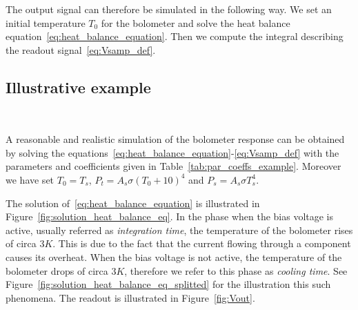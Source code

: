 The output signal can therefore be simulated in the following way. We
set an initial temperature $T_0$ for the bolometer and solve the heat
balance equation~\eqref{eq:heat_balance_equation}. Then we compute the
integral describing the readout signal~\eqref{eq:Vsamp_def}.


\subsection{Illustrative example}~\label{sec:example}

A reasonable and realistic simulation of the bolometer response can be
obtained by solving the
equations~\eqref{eq:heat_balance_equation}-\eqref{eq:Vsamp_def} with
the parameters and coefficients given in
Table~\ref{tab:par_coeffs_example}. Moreover we have set $T_0=T_s$,
$P_t=A_s \sigma (T_0+10)^4$ and $P_s=A_s \sigma T_s^4$.



The solution of~\eqref{eq:heat_balance_equation} is illustrated in
Figure~\ref{fig:solution_heat_balance_eq}. In the phase when the bias
voltage is active, usually referred as \emph{integration time}, the
temperature of the bolometer rises of circa $3K$. This is due to the
fact that the current flowing through a component causes its
overheat. When the bias voltage is not active, the temperature of the
bolometer drops of circa $3K$, therefore we refer to this phase as
\emph{cooling time}. See
Figure~\ref{fig:solution_heat_balance_eq_splitted} for the
illustration this such phenomena. The readout is illustrated in
Figure~\ref{fig:Vout}.


